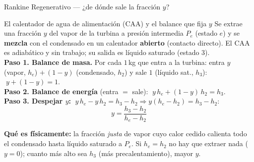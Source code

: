 \documentclass[aspectratio=169,10pt]{beamer}
\begin{document}
\begin{frame}{Rankine Regenerativo --- ¿de dónde sale la fracción $y$?}
\begin{cardidea}{El calentador de agua de alimentación (CAA) y el balance que fija $y$}{\faRandom}
{\footnotesize
Se extrae una fracción $y$ del vapor de la turbina a presión intermedia $P_e$ (estado $e$) y se \textbf{mezcla} con el condensado en un calentador \textbf{abierto} (contacto directo). El CAA es adiabático y sin trabajo; su salida es líquido saturado (estado 3).\\[1.2mm]
\textbf{Paso 1. Balance de masa.} Por cada $1$\,kg que entra a la turbina: entra $y$ (vapor, $h_e$) $+\,(1-y)$ (condensado, $h_2$) y sale $1$ (líquido sat., $h_3$): $\;y+(1-y)=1$.\\[1.2mm]
\textbf{Paso 2. Balance de energía} (entra $=$ sale): $\;y\,h_e+(1-y)\,h_2=h_3$.\\[1.2mm]
\textbf{Paso 3. Despejar $y$:} $\;y\,h_e-y\,h_2=h_3-h_2\Rightarrow y(h_e-h_2)=h_3-h_2$:
$$\boxed{\;y=\dfrac{h_3-h_2}{h_e-h_2}\;}$$
}
\end{cardidea}
\vspace{1mm}
\begin{cardnota}[\faInfoCircle]
{\footnotesize\textbf{Qué es físicamente:} la fracción \emph{justa} de vapor cuyo calor cedido calienta todo el condensado hasta líquido saturado a $P_e$. Si $h_e=h_2$ no hay que extraer nada ($y=0$); cuanto más alto sea $h_3$ (más precalentamiento), mayor $y$.}
\end{cardnota}
\end{frame}
\end{document}
